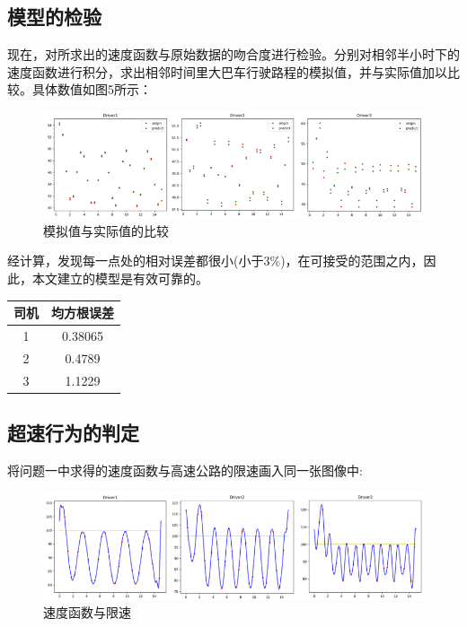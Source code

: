 \documentclass[bwprint]{cumcmthesis}
\begin{document}
        \subsection{模型的检验}
            现在，对所求出的速度函数与原始数据的吻合度进行检验。分别对相邻半小时下的速度函数进行积分，求出相邻时间里大巴车行驶路程的模拟值，并与实际值加以比较。具体数值如图5所示：
            \begin{figure}[htbp]
                \centering
                \includegraphics[width=1\linewidth]{compare.png}
                \caption{模拟值与实际值的比较}
            \end{figure}

            经计算，发现每一点处的相对误差都很小(小于$3\%$)，在可接受的范围之内，因此，本文建立的模型是有效可靠的。
            \begin{center}
                \begin{tabular}{cc}
                    \hline
                    司机	&  均方根误差 \\ \hline
                    1 & 0.38065 \\ 
                    2 & 0.4789 \\ 
                    3 & 1.1229 \\ 
                    \hline
                \end{tabular}
            \end{center}

        
        \subsection{超速行为的判定}
        将问题一中求得的速度函数与高速公路的限速画入同一张图像中:
        \begin{figure}[htbp]
            \centering
            \includegraphics[width=1\linewidth]{v100.png}
            \caption{速度函数与限速}
        \end{figure}
\end{document}

